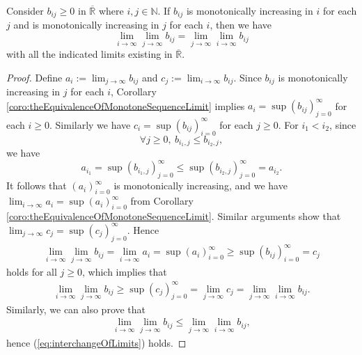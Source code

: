 \begin{thm}
  \label{thm:interchangeOfLimits}
  Consider $b_{ij}\ge 0$ in $\overline{\mathbb{R}}$ where $i,j\in\mathbb{N}$.
  If $b_{ij}$ is monotonically increasing in $i$ for each $j$
  and is monotonically increasing in $j$ for each $i$,
  then we have
  \begin{equation}
    \label{eq:interchangeOfLimits}
    \lim_{i\rightarrow\infty} \lim_{j\rightarrow\infty} b_{ij}
    = \lim_{j\rightarrow\infty} \lim_{i\rightarrow\infty} b_{ij}
  \end{equation}
  with all the indicated limits existing in $\overline{\mathbb{R}}$.
\end{thm}
\begin{proof}
  Define $a_{i}:=\lim_{j\rightarrow\infty}b_{ij}$
  and $c_{j}:=\lim_{i\rightarrow\infty}b_{ij}$. 
  Since $b_{ij}$ is monotonically increasing in $j$ for each $i$,
  Corollary \ref{coro:theEquivalenceOfMonotoneSequenceLimit}
  implies $a_{i}=\sup(b_{ij})_{j=0}^{\infty}$ for each $i\ge 0$.
  Similarly we have $c_{i}=\sup(b_{ij})_{i=0}^{\infty}$ for each $j\ge 0$.
  For $i_{1}<i_{2}$, since
  \begin{displaymath}
    \forall j\ge 0,\
    b_{i_{1},j}\le b_{i_{2},j},
  \end{displaymath}
  we have
  \begin{displaymath}
    a_{i_{1}}=\sup(b_{i_{1},j})_{j=0}^{\infty}
    \le \sup(b_{i_{2},j})_{j=0}^{\infty} =a_{i_{2}}.
  \end{displaymath}
  It follows that
  $(a_{i})_{i=0}^{\infty}$ is monotonically increasing, and we have
  $\lim_{i\rightarrow\infty}a_{i}=\sup(a_{i})_{i=0}^{\infty}$
  from Corollary \ref{coro:theEquivalenceOfMonotoneSequenceLimit}.
  Similar arguments show that
  $\lim_{j\rightarrow\infty}c_{j}=\sup(c_{j})_{j=0}^{\infty}.$
  Hence
  \begin{align*}
    \lim_{i\rightarrow\infty} \lim_{j\rightarrow\infty} b_{ij}
    =\lim_{i\rightarrow\infty} a_{i}
    =\sup(a_{i})_{i=0}^{\infty}
    \ge \sup(b_{ij})_{i=0}^{\infty}
    =c_{j}
  \end{align*}
  holds for all $j\ge 0$, which implies that
  \begin{align*}
    \lim_{i\rightarrow\infty} \lim_{j\rightarrow\infty} b_{ij}
    \ge \sup(c_{j})_{j=0}^{\infty}
    =\lim_{j\rightarrow\infty} c_{j}
    =\lim_{j\rightarrow\infty} \lim_{i\rightarrow\infty} b_{ij}.
  \end{align*}
  Similarly, we can also prove that
  \begin{align*}
    \lim_{i\rightarrow\infty} \lim_{j\rightarrow\infty} b_{ij}
    \le \lim_{j\rightarrow\infty} \lim_{i\rightarrow\infty} b_{ij},
  \end{align*}
  hence (\ref{eq:interchangeOfLimits}) holds.
\end{proof}

